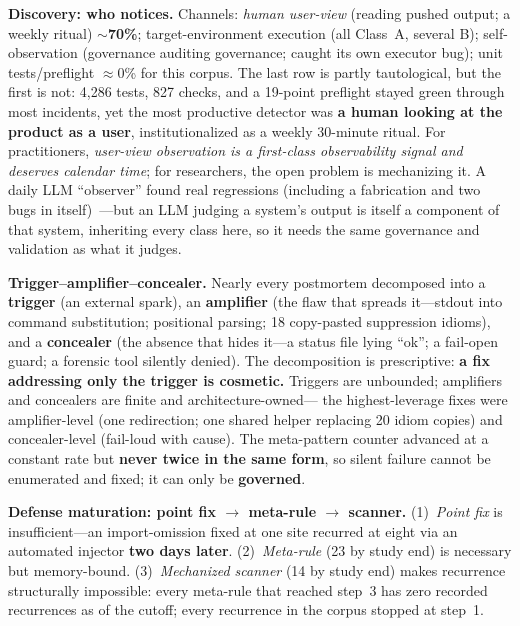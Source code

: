 \documentclass[conference]{IEEEtran}
\begin{document}
\textbf{Discovery: who notices.}\label{sec:discovery} Channels:
\emph{human user-view} (reading pushed output; a weekly ritual)
\textbf{$\sim$70\%}; target-environment execution (all Class~A, several
B); self-observation (governance auditing governance; caught its own
executor bug); unit tests/preflight $\approx$0\% for this corpus. The last
row is partly tautological, but the first is not: 4{,}286 tests, 827
checks, and a 19-point preflight stayed green through most incidents, yet
the most productive detector was \textbf{a human looking at the product as
a user}, institutionalized as a weekly 30-minute ritual. For
practitioners, \emph{user-view observation is a first-class observability
signal and deserves calendar time}; for researchers, the open problem is
mechanizing it. A daily LLM ``observer'' found real regressions (including
a fabrication and two bugs in itself)~\cite{zheng2023judge}---but an LLM
judging a system's output is itself a component of that system, inheriting
every class here, so it needs the same governance and validation as what
it judges.

\textbf{Trigger--amplifier--concealer.} Nearly every postmortem decomposed
into a \textbf{trigger} (an external spark), an \textbf{amplifier} (the
flaw that spreads it---stdout into command substitution; positional
parsing; 18 copy-pasted suppression idioms), and a \textbf{concealer} (the
absence that hides it---a status file lying ``ok''; a fail-open guard; a
forensic tool silently denied). The decomposition is prescriptive:
\textbf{a fix addressing only the trigger is cosmetic.} Triggers are
unbounded; amplifiers and concealers are finite and architecture-owned---%
the highest-leverage fixes were amplifier-level (one redirection; one
shared helper replacing 20 idiom copies) and concealer-level (fail-loud
with cause). The meta-pattern counter advanced at a constant rate but
\textbf{never twice in the same form}, so silent failure cannot be
enumerated and fixed; it can only be \textbf{governed}.

\textbf{Defense maturation: point fix $\to$ meta-rule $\to$
scanner.}\label{sec:maturation} (1)~\emph{Point fix} is
insufficient---an import-omission fixed at one site recurred at eight via
an automated injector \textbf{two days later}. (2)~\emph{Meta-rule} (23 by
study end) is necessary but memory-bound. (3)~\emph{Mechanized scanner}
(14 by study end) makes recurrence structurally impossible: every meta-rule
that reached step~3 has zero recorded recurrences as of the cutoff; every
recurrence in the corpus stopped at step~1.
\end{document}

